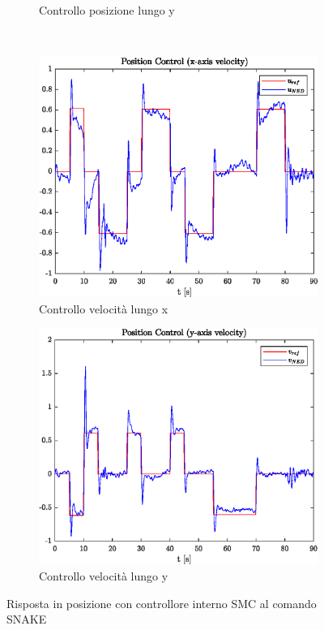 \begin{figure}
\begin{subfigure}{0.45\textwidth}
		\caption{Controllo posizione lungo y}
	\end{subfigure}
	\\
	\begin{subfigure}{0.45\textwidth}
		\centering
		\includegraphics[width=1\textwidth]{Simulazioni/Figure/SMC/SNAKE/PositionControlXVel}
		\caption{Controllo velocità lungo x}
	\end{subfigure}
	\hfill
	\begin{subfigure}{0.45\textwidth}
		\centering
		\includegraphics[width=1\textwidth]{Simulazioni/Figure/SMC/SNAKE/PositionControlYVel}
		\caption{Controllo velocità lungo y}
	\end{subfigure}
	\caption{Risposta in posizione con controllore interno SMC al comando SNAKE}
\end{figure}

